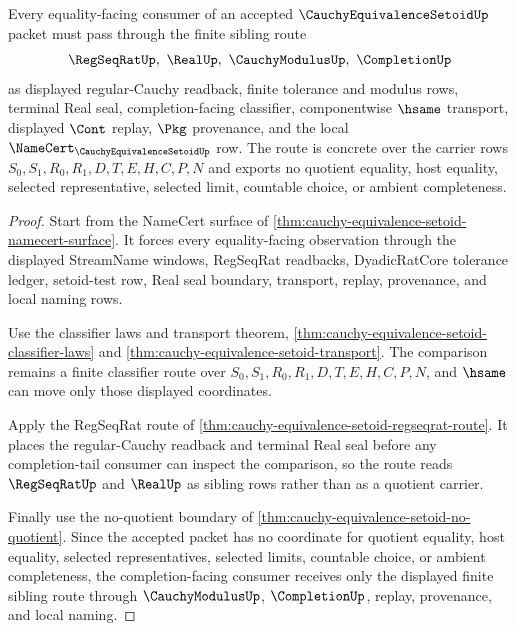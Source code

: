 \begin{theorem}
\label{def:cauchy-equivalence-setoid-sibling-route}
Every equality-facing consumer of an accepted $\CauchyEquivalenceSetoidUp$ packet must pass through the finite sibling route
$$
\RegSeqRatUp,\ \RealUp,\ \CauchyModulusUp,\ \CompletionUp
$$
as displayed regular-Cauchy readback, finite tolerance and modulus rows, terminal Real seal, completion-facing classifier, componentwise $\hsame$ transport, displayed $\Cont$ replay, $\Pkg$ provenance, and the local $\NameCert_{\CauchyEquivalenceSetoidUp}$ row. The route is concrete over the carrier rows $S_0,S_1,R_0,R_1,D,T,E,H,C,P,N$ and exports no quotient equality, host equality, selected representative, selected limit, countable choice, or ambient completeness.
\end{theorem}
\begin{proof}
Start from the NameCert surface of \autoref{thm:cauchy-equivalence-setoid-namecert-surface}. It forces every equality-facing observation through the displayed StreamName windows, RegSeqRat readbacks, DyadicRatCore tolerance ledger, setoid-test row, Real seal boundary, transport, replay, provenance, and local naming rows.

Use the classifier laws and transport theorem, \autoref{thm:cauchy-equivalence-setoid-classifier-laws} and \autoref{thm:cauchy-equivalence-setoid-transport}. The comparison remains a finite classifier route over $S_0,S_1,R_0,R_1,D,T,E,H,C,P,N$, and $\hsame$ can move only those displayed coordinates.

Apply the RegSeqRat route of \autoref{thm:cauchy-equivalence-setoid-regseqrat-route}. It places the regular-Cauchy readback and terminal Real seal before any completion-tail consumer can inspect the comparison, so the route reads $\RegSeqRatUp$ and $\RealUp$ as sibling rows rather than as a quotient carrier.

Finally use the no-quotient boundary of \autoref{thm:cauchy-equivalence-setoid-no-quotient}. Since the accepted packet has no coordinate for quotient equality, host equality, selected representatives, selected limits, countable choice, or ambient completeness, the completion-facing consumer receives only the displayed finite sibling route through $\CauchyModulusUp$, $\CompletionUp$, replay, provenance, and local naming.
\end{proof}

